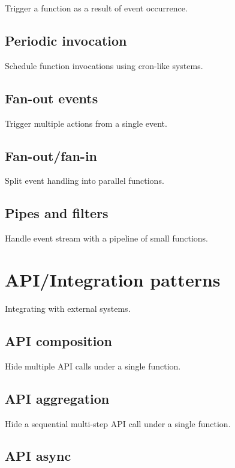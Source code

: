 Trigger a function as a result of event occurrence.

\subsection{Periodic invocation} \label{subsec:periodicInvocation}

Schedule function invocations using cron-like systems.

\subsection{Fan-out events} \label{subsec:FanoutEvents}

Trigger multiple actions from a single event.

\subsection{Fan-out/fan-in} \label{subsec:FanoutFanin}

Split event handling into parallel functions.

\subsection{Pipes and filters} \label{subsec:PipesAndFilters}

Handle event stream with a pipeline of small functions.

\section{API/Integration patterns} \label{sec:apiPatterns}

Integrating with external systems.

\subsection{API composition} \label{subsec:apiComposition}

Hide multiple API calls under a single function.

\subsection{API aggregation} \label{subsec:apiAggregation}

Hide a sequential multi-step API call under a single function.

\subsection{API async} \label{subsec:apiAsync}


